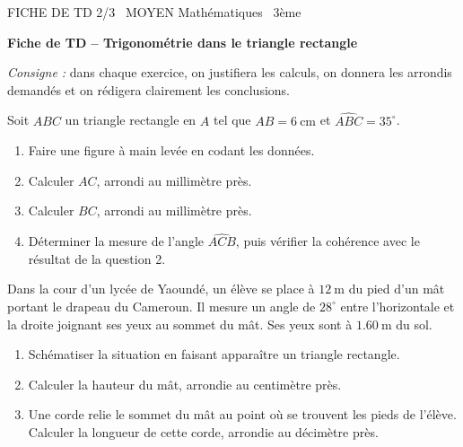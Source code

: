 \documentclass[11pt]{article}
\begin{document}
\begin{tcolorbox}[enhanced,colback=popink,colframe=popink,arc=10pt,boxrule=0pt,left=12pt,right=12pt,top=9pt,bottom=9pt]
{\color{white}\popxbold\small FICHE DE TD 2/3 \textbullet\ MOYEN \hfill Mathématiques \textbullet\ 3ème\par}
\end{tcolorbox}
\vspace{4pt}
\textbf{Fiche de TD -- Trigonométrie dans le triangle rectangle}

\emph{Consigne :} dans chaque exercice, on justifiera les calculs, on donnera les arrondis demandés et on rédigera clairement les conclusions.

\begin{exercice}
Soit $ABC$ un triangle rectangle en $A$ tel que $AB = \SI{6}{\centi\meter}$ et $\widehat{ABC} = 35^\circ$.
\begin{enumerate}
\item Faire une figure à main levée en codant les données.
\item Calculer $AC$, arrondi au millimètre près.
\item Calculer $BC$, arrondi au millimètre près.
\item Déterminer la mesure de l'angle $\widehat{ACB}$, puis vérifier la cohérence avec le résultat de la question 2.
\end{enumerate}
\end{exercice}

\begin{exercice}
Dans la cour d'un lycée de Yaoundé, un élève se place à $\SI{12}{\meter}$ du pied d'un mât portant le drapeau du Cameroun. Il mesure un angle de $28^\circ$ entre l'horizontale et la droite joignant ses yeux au sommet du mât. Ses yeux sont à $\SI{1,60}{\meter}$ du sol.
\begin{enumerate}
\item Schématiser la situation en faisant apparaître un triangle rectangle.
\item Calculer la hauteur du mât, arrondie au centimètre près.
\item Une corde relie le sommet du mât au point où se trouvent les pieds de l'élève. Calculer la longueur de cette corde, arrondie au décimètre près.
\end{enumerate}
\end{exercice}
\end{document}

